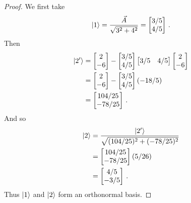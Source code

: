 \begin{proof}
We first take
\begin{equation}
   \ket{1} = \frac{\vec{A}}{\sqrt{3^2 + 4^2}} = 
   \begin{bmatrix}
   3/5 \\
   4/5
   \end{bmatrix}\,.
\end{equation}
Then
\begin{align}
   \ket{2'} &=
   \begin{bmatrix}
   2 \\
   -6
   \end{bmatrix}
   - 
   \begin{bmatrix}
   3/5 \\
   4/5
   \end{bmatrix}
   \begin{bmatrix}
   3/5 & 4/5
   \end{bmatrix}
   \begin{bmatrix}
   2 \\
   -6
   \end{bmatrix} \\
   &= 
   \begin{bmatrix}
   2 \\
   -6
   \end{bmatrix}
   - 
   \begin{bmatrix}
   3/5 \\
   4/5
   \end{bmatrix}
   (-18/5) \\
   &= 
   \begin{bmatrix}
   104/25 \\
   -78/25
   \end{bmatrix}\,.
\end{align}
And so
\begin{align}
    \ket{2} &= \frac{\ket{2'}}{\sqrt{(104/25)^2 + (-78/25)^2}} \\
    &= 
    \begin{bmatrix}
   104/25 \\
   -78/25
   \end{bmatrix}
   (5/26) \\
   &= 
   \begin{bmatrix}
   4/5 \\
   -3/5
   \end{bmatrix}\,.
\end{align}
Thus $\ket{1}$ and $\ket{2}$ form an orthonormal basis.


\end{proof}
